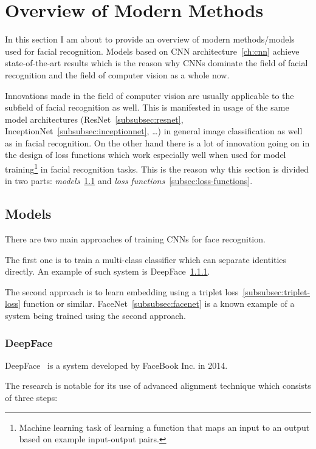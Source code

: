 \section{Overview of Modern Methods}\label{sec:mod-methods}
In this section I am about to provide an overview of modern methods/models used for facial recognition.
Models based on CNN architecture~\ref{ch:cnn} achieve state-of-the-art results which is the reason why CNNs dominate the
field of facial recognition and the field of computer vision as a whole now.

Innovations made in the field of computer vision are usually applicable to the subfield of facial recognition as well.
This is manifested in usage of the same model architectures (ResNet~\ref{subsubsec:resnet},
InceptionNet~\ref{subsubsec:inceptionnet}, \ldots) in general image classification as well as in facial recognition.
On the other hand there is a lot of innovation going on in the design of loss functions which work especially well
when used for model training\footnote{Machine learning task of learning a function that maps an input to an output
based on example input-output pairs.} in facial recognition tasks.
This is the reason why this section is divided in two parts: \textit{models}~\ref{subsec:models} and
\textit{loss functions}~\ref{subsec:loss-functions}.

\subsection{Models}\label{subsec:models}
There are two main approaches of training CNNs for face recognition.

The first one is to train a multi-class classifier which can separate identities directly.
An example of such system is DeepFace~\ref{subsubsec:deepface}.

The second approach is to learn embedding using a triplet loss~\ref{subsubsec:triplet-loss} function or similar.
FaceNet~\ref{subsubsec:facenet} is a known example of a system being trained using the second approach.

\subsubsection{DeepFace}\label{subsubsec:deepface}
DeepFace~\cite{DeepFace} is a system developed by FaceBook Inc. in 2014.

The research is notable for its use of advanced alignment technique which consists of three steps:

